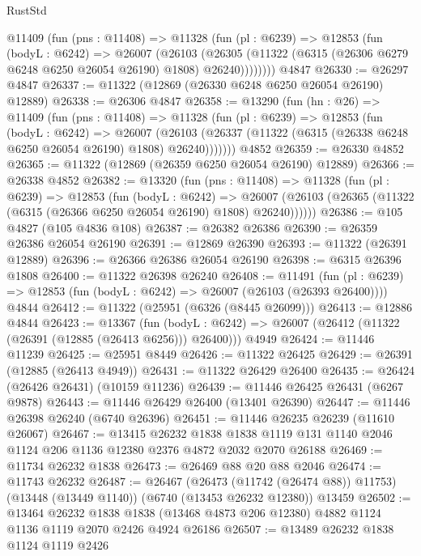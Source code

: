 \begin{lexlean}{RustStd}
\begin{coremodule}
      @11409
        (fun (pns : @11408) =>
        @11328
          (fun (pl : @6239) =>
          @12853
            (fun (bodyL : @6242) =>
            @26007
              (@26103
                (@26305
                  (@11322 (@6315 (@26306 @6279 @6248 @6250 @26054 @26190) @1808) @26240))))))))
    @4847
@26330 := @26297 @4847
@26337 := @11322 (@12869 (@26330 @6248 @6250 @26054 @26190) @12889)
@26338 := @26306 @4847
@26358 := @13290
    (fun (hn : @26) =>
    @11409
      (fun (pns : @11408) =>
      @11328
        (fun (pl : @6239) =>
        @12853
          (fun (bodyL : @6242) =>
          @26007
            (@26103 (@26337 (@11322 (@6315 (@26338 @6248 @6250 @26054 @26190) @1808) @26240)))))))
    @4852
@26359 := @26330 @4852
@26365 := @11322 (@12869 (@26359 @6250 @26054 @26190) @12889)
@26366 := @26338 @4852
@26382 := @13320
    (fun (pns : @11408) =>
    @11328
      (fun (pl : @6239) =>
      @12853
        (fun (bodyL : @6242) =>
        @26007 (@26103 (@26365 (@11322 (@6315 (@26366 @6250 @26054 @26190) @1808) @26240))))))
@26386 := @105 @4827 (@105 @4836 @108)
@26387 := @26382 @26386
@26390 := @26359 @26386 @26054 @26190
@26391 := @12869 @26390
@26393 := @11322 (@26391 @12889)
@26396 := @26366 @26386 @26054 @26190
@26398 := @6315 @26396 @1808
@26400 := @11322 @26398 @26240
@26408 := @11491
    (fun (pl : @6239) => @12853 (fun (bodyL : @6242) => @26007 (@26103 (@26393 @26400))))
    @4844
@26412 := @11322 (@25951 (@6326 (@8445 @26099)))
@26413 := @12886 @4844
@26423 := @13367
    (fun (bodyL : @6242) => @26007 (@26412 (@11322 (@26391 (@12885 (@26413 @6256))) @26400)))
    @4949
@26424 := @11446 @11239
@26425 := @25951 @8449
@26426 := @11322 @26425
@26429 := @26391 (@12885 (@26413 @4949))
@26431 := @11322 @26429 @26400
@26435 := @26424 (@26426 @26431) (@10159 @11236)
@26439 := @11446 @26425 @26431 (@6267 @9878)
@26443 := @11446 @26429 @26400 (@13401 @26390)
@26447 := @11446 @26398 @26240 (@6740 @26396)
@26451 := @11446 @26235 @26239 (@11610 @26067)
@26467 := @13415
    @26232
    @1838
    @1838
    @1119
    @131
    @1140
    @2046
    @1124
    @206
    @1136
    @12380
    @2376
    @4872
    @2032
    @2070
    @26188
@26469 := @11734 @26232 @1838
@26473 := @26469 @88 @20 @88 @2046
@26474 := @11743 @26232
@26487 := @26467
    (@26473 (@11742 (@26474 @88)) @11753)
    (@13448 (@13449 @1140))
    (@6740 (@13453 @26232 @12380))
    @13459
@26502 := @13464
    @26232
    @1838
    @1838
    (@13468 @4873 @206 @12380)
    @4882
    @1124
    @1136
    @1119
    @2070
    @2426
    @4924
    @26186
@26507 := @13489 @26232 @1838 @1124 @1119 @2426

\end{coremodule}
\end{lexlean}
